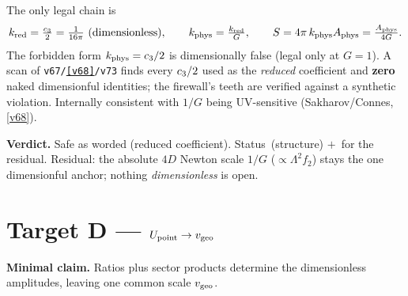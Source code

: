\begin{winbox}
The only legal chain is
\[
  k_{\mathrm{red}}=\tfrac{\cthree}{2}=\tfrac{1}{16\pi}\ \text{(dimensionless)},\qquad
  k_{\mathrm{phys}}=\tfrac{k_{\mathrm{red}}}{G},\qquad
  S=4\pi\,k_{\mathrm{phys}}A_{\mathrm{phys}}=\tfrac{A_{\mathrm{phys}}}{4G}.
\]
The forbidden form $k_{\mathrm{phys}}=c_3/2$ is dimensionally false (legal only at $G=1$). A
scan of \texttt{v67/\vref{v68}/v73} finds every $c_3/2$ used as the \emph{reduced} coefficient and
\textbf{zero} naked dimensionful identities; the firewall's teeth are verified against a synthetic
violation. Internally consistent with $1/G$ being UV-sensitive (Sakharov/Connes, \vref{v68}).
\end{winbox}

\noindent\textbf{Verdict.} Safe as worded (reduced coefficient). Status \mE\,(structure) $+$ \mO\,for
the residual. Residual: the absolute $4D$ Newton scale $1/G$ ($\propto \Lambda^2 f_2$) stays the one
dimensionful anchor; nothing \emph{dimensionless} is open.

\section*{Target D --- $U_{\mathrm{point}}\to v_{\mathrm{geo}}$}\label{sec:D}
\noindent\textbf{Minimal claim.} Ratios plus sector products determine the dimensionless amplitudes,
leaving one common scale $v_{\mathrm{geo}}$.

